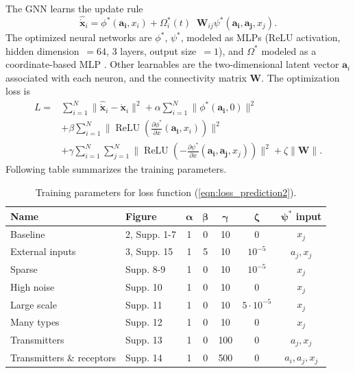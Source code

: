 \documentclass[10pt,twocolumn]{article}
\DeclareMathOperator*{\Agg}{\sum_{j=1}^{N}}
\DeclareMathOperator*{\relu}{ReLU}
\newcommand{\loss}{L}
\renewcommand\Vec[1]{\ensuremath{\boldsymbol{#1}}}
\newcommand\Mat[1]{\ensuremath{\boldsymbol{#1}}}
\begin{document}
\noindent
The GNN learns the update rule
\begin{equation}
\widehat{\dot{\Vec{x}}}_{i} =\phi^*(\Vec{a_i}, x_i) + \Omega_i^*(t) \Agg \Mat{W}_{ij}\psi^*(\Vec{a_i},\Vec{a_j},x_j).
\label{eqn:GNN2}
\end{equation}
The optimized neural networks are $\phi^*$, $\psi^*$, modeled as MLPs (ReLU activation, hidden dimension~$=64$, 3 layers, output size~$= 1$), and $\Omega^*$ modeled as a coordinate-based MLP \citep[][, input size~$= 3$,  hidden dimension~$=128$, 5 layers, output size~$= 1$, $\omega=0.3$]{sitzmann_implicit_2020}. Other learnables are the two-dimensional latent vector $\Vec{a}_i$ associated with each neuron, and the connectivity matrix $\Mat{W}$. The optimization loss is
\begin{equation}
\begin{split}
\loss = {} & \sum_{i = 1}^N \lVert \widehat{\dot{\Vec{x}}}_{i} - \dot{\Vec{x}}_{i}\rVert^2 + \alpha\sum_{i = 1}^N \lVert\phi^*(\Vec{a_i}, 0)\rVert^2 \\
& + \beta\sum_{i = 1}^N \lVert \relu(\frac{\partial\phi^*}{\partial x}(\Vec{a_i}, x_i))\rVert^2 \\
& + \gamma\sum_{i = 1}^N\sum_{j = 1}^N \lVert \relu(-\frac{\partial\psi^*}{\partial x}(\Vec{a_i}, \Vec{a_j}, x_j))\rVert^2  + \zeta\lVert \Mat{W} \rVert.
\end{split}
\label{eqn:loss_prediction2}
\end{equation}
\noindent
Following table summarizes the training parameters.

\begin{table}[h]
\centering
\footnotesize
\begin{tabular}{|l|p{2.2cm}|c|c|c|c|c|}
\hline
\textbf{Name} & \textbf{Figure} & $\boldsymbol{\alpha}$ & $\boldsymbol{\beta}$ & $\boldsymbol{\gamma}$ & $\boldsymbol{\zeta}$ & $\boldsymbol{\psi^*}$ \textbf{input} \\
\hline
Baseline & 2, Supp. 1-7 & 1 & 0 & 10 & 0 & $x_j$ \\
\hline
External inputs & 3, Supp. 15 & 1 & 5 & 10 & $10^{-5}$ & $a_j, x_j$ \\
\hline
Sparse & Supp. 8-9 & 1 & 0 & 10 & $10^{-5}$ & $x_j$ \\
\hline
High noise & Supp. 10 & 1 & 0 & 10 & 0 & $x_j$ \\
\hline
Large scale & Supp. 11 & 1 & 0 & 10 & $5 \cdot 10^{-5}$ & $x_j$ \\
\hline
Many types & Supp. 12 & 1 & 0 & 10 & 0 & $x_j$ \\
\hline
Transmitters & Supp. 13 & 1 & 0 & 100 & 0 & $a_j, x_j$ \\
\hline
Transmitters \& receptors & Supp. 14 & 1 & 0 & 500 & 0 & $a_i, a_j, x_j$ \\
\hline
\end{tabular}
\caption{Training parameters for loss function (\cref{eqn:loss_prediction2}).}
\label{table_train_parameters}
\end{table}
\end{document}
